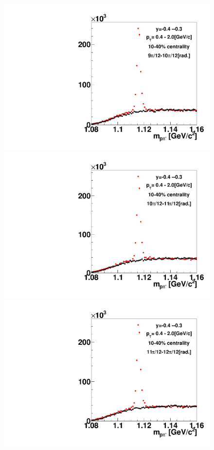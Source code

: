 \begin{figure}[h]
\includegraphics[width=0.14\linewidth]{chapterX/fig/ld_v1_sig/kf_ptslice0_cent1_ld_flow_phi10_rap8_check.pdf}
\includegraphics[width=0.14\linewidth]{chapterX/fig/ld_v1_sig/kf_ptslice0_cent1_ld_flow_phi11_rap8_check.pdf}
\includegraphics[width=0.14\linewidth]{chapterX/fig/ld_v1_sig/kf_ptslice0_cent1_ld_flow_phi12_rap8_check.pdf}


\end{figure}

